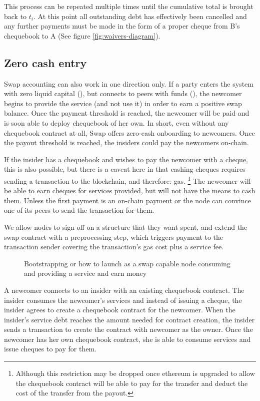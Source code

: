 This process can be repeated multiple times until the cumulative total is brought back to $t_i$. At this point all outstanding debt has effectively been cancelled and any further payments must be made in the form of a proper cheque from B's chequebook to A (See figure \ref{fig:waivers-diagram}).


\subsection{Zero cash entry}\label{sec:zero-cash-entry}

Swap accounting can also work in one direction only. If a party enters the system with zero liquid capital (), but connects to peers with funds (), the newcomer begins to provide the service (and not use it) in order to earn a positive swap balance. Once the payment threshold is reached, the newcomer will be paid and is soon able to deploy chequebook of her own.
In short, even without any chequebook contract at all, Swap offers zero-cash onboarding to newcomers. Once the payout threshold is reached, the insiders could pay the newcomers on-chain. 

If the insider has a chequebook and wishes to pay the newcomer with a cheque, this is also possible, but there is a caveat here in that cashing cheques requires sending a transaction to the blockchain, and therefore: gas.%
%
\footnote{Although this restriction may be dropped once ethereum is upgraded to allow the chequebook contract will be able to pay for the transfer and deduct the cost of the transfer from the payout.}
%
The newcomer will be able to earn cheques for services provided, but will not have the means to cash them. 
Unless the first payment is an on-chain payment or the node can convince one of its peers to send the transaction for them.

We allow nodes to sign off on a structure that they want spent, and extend the swap contract with a preprocessing step, which triggers payment to the transaction sender covering the transaction's gas cost plus a service fee. 



\begin{figure}[htbp]
\centering

\caption[Zero cost entry]{Bootstrapping or how to launch as a swap capable node consuming and providing a
service and earn money}
\label{fig:zero-cost-entry}
\end{figure}

  
A newcomer connects to  an insider with an existing chequebook contract. The insider consumes the newcomer's services and instead of issuing a cheque, the insider agrees to create a chequebook contract for the newcomer. When the insider's service debt reaches the amount needed for contract creation, the insider sends a transaction to create the contract with newcomer as the owner. Once the newcomer has her own chequebook contract, she is able to consume services and issue cheques to pay for them.
 
